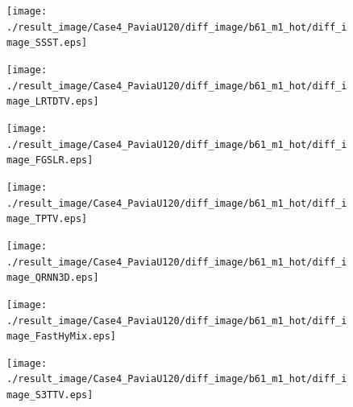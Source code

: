 \begin{figure}[t]
\begin{center}
		\begin{minipage}{0.125\hsize}
			\centerline{\texttt{[image: ./result\_image/Case4\_PaviaU120/diff\_image/b61\_m1\_hot/diff\_image\_SSST.eps]}} %
		\end{minipage}
		\begin{minipage}{0.125\hsize}
			\centerline{\texttt{[image: ./result\_image/Case4\_PaviaU120/diff\_image/b61\_m1\_hot/diff\_image\_LRTDTV.eps]}} %
		\end{minipage}
		\begin{minipage}{0.125\hsize}
			\centerline{\texttt{[image: ./result\_image/Case4\_PaviaU120/diff\_image/b61\_m1\_hot/diff\_image\_FGSLR.eps]}} %
		\end{minipage}
		\begin{minipage}{0.125\hsize}
			\centerline{\texttt{[image: ./result\_image/Case4\_PaviaU120/diff\_image/b61\_m1\_hot/diff\_image\_TPTV.eps]}} %
		\end{minipage}
		\begin{minipage}{0.125\hsize}
			\centerline{\texttt{[image: ./result\_image/Case4\_PaviaU120/diff\_image/b61\_m1\_hot/diff\_image\_QRNN3D.eps]}} %
		\end{minipage}
		\begin{minipage}{0.125\hsize}
			\centerline{\texttt{[image: ./result\_image/Case4\_PaviaU120/diff\_image/b61\_m1\_hot/diff\_image\_FastHyMix.eps]}} %
		\end{minipage}
		\begin{minipage}{0.125\hsize}
			\centerline{\texttt{[image: ./result\_image/Case4\_PaviaU120/diff\_image/b61\_m1\_hot/diff\_image\_S3TTV.eps]}} %
		\end{minipage}
		\begin{minipage}{0.050\hsize}

\end{minipage}
\end{center}
\end{figure}
